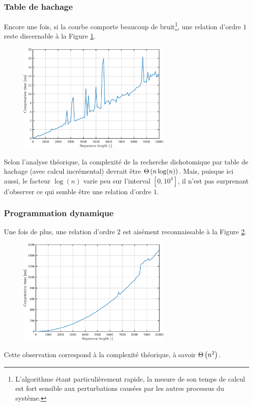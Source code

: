 \documentclass[a4paper, 12pt]{article}
\begin{document}
	\subsubsection*{Table de hachage}
	Encore une fois, si la courbe comporte beaucoup de bruit\footnote{L'algorithme étant particulièrement rapide, la mesure de son temps de calcul est fort sensible aux perturbations causées par les autres processus du système.}, une relation d'ordre $1$ reste discernable à la Figure \ref{fig:hash}.
	\begin{figure}[H]
		\centering
		\includegraphics[width=0.68\textwidth]{resources/pdf/hash.pdf}
		\label{fig:hash}
	\end{figure}
	Selon l'analyse théorique, la complexité de la recherche dichotomique par table de hachage (avec calcul incrémental) devrait être $\Theta\left(n \log(n)\right)$. Mais, puisque ici aussi, le facteur $\log(n)$ varie peu sur l'interval $[0, 10^4]$, il n'est pas surprenant d'observer ce qui semble être une relation d'ordre $1$.
	\subsubsection*{Programmation dynamique}
	Une fois de plus, une relation d'ordre $2$ est aisément reconnaissable à la Figure \ref{fig:dynamic}.
	\begin{figure}[H]
		\centering
		\includegraphics[width=0.68\textwidth]{resources/pdf/dynamic.pdf}
		\label{fig:dynamic}
	\end{figure}
	Cette observation correspond à la complexité théorique, à savoir $\Theta\left(n^2\right)$.
	\newpage
\end{document}
